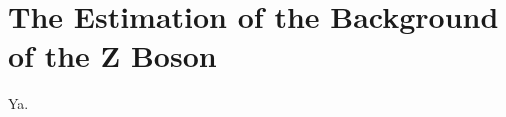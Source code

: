 \documentclass[class=NTHU_thesis, crop=false]{standalone}
\begin{document}
\chapter{The Estimation of the Background of the Z Boson}
\label{chap:Z_bkg_estimation}
Ya.
\end{document}
